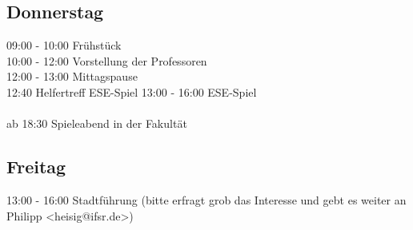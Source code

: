 \documentclass[a4paper,12pt]{report}
\begin{document}
\subsection{Donnerstag}
09:00 - 10:00 Frühstück\\
10:00 - 12:00 Vorstellung der Professoren\\
12:00 - 13:00 Mittagspause\\
12:40 Helfertreff ESE-Spiel
13:00 - 16:00 ESE-Spiel\\
\\
ab 18:30 Spieleabend in der Fakultät\\

\subsection{Freitag}
13:00 - 16:00 Stadtführung (bitte erfragt grob das Interesse und gebt es weiter an Philipp <heisig@ifsr.de>)\\
\end{document}
